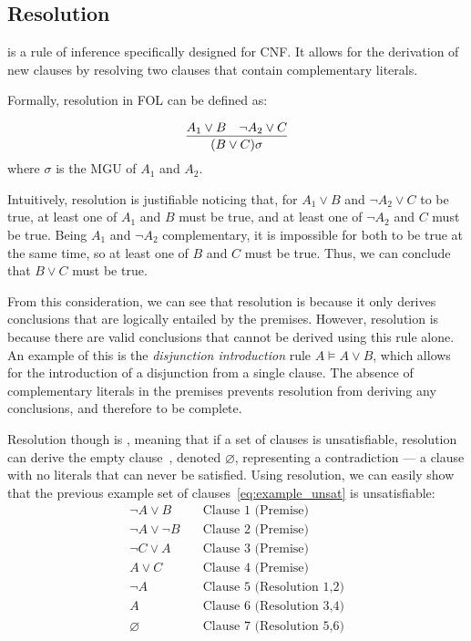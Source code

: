 \subsection{Resolution}\label{subsec:resolution}

 is a rule of inference specifically designed for CNF\@. It allows for the derivation of new clauses by resolving two clauses that contain complementary literals.

Formally, resolution in FOL can be defined as:

\begin{equation}
  \infer{(B\lor C)\sigma}{A_1 \lor B & \neg A_2 \lor C}
\end{equation}
\indent where \(\sigma\) is the MGU of \(A_1\) and \(A_2\).

\noindent Intuitively, resolution is justifiable noticing that, for \(A_1 \lor B\) and \(\neg A_2 \lor C\) to be true, at least one of \(A_1\) and \(B\) must be true, and at least one of \(\neg A_2\) and \(C\) must be true.
Being \(A_1\) and \(\neg A_2\) complementary, it is impossible for both to be true at the same time, so at least one of \(B\) and \(C\) must be true. Thus, we can conclude that \(B \lor C\) must be true.

From this consideration, we can see that resolution is  because it only derives conclusions that are logically entailed by the premises.
However, resolution is  because there are valid conclusions that cannot be derived using this rule alone.
An example of this is the \emph{disjunction introduction} rule \(A \models A \lor B\), which allows for the introduction of a disjunction from a single clause.
The absence of complementary literals in the premises prevents resolution from deriving any conclusions, and therefore to be complete.

Resolution though is , meaning that if a set of clauses is unsatisfiable, resolution can derive the empty clause~\cite{robinson1965}, denoted \(\varnothing\), representing a contradiction --- a clause with no literals that can never be satisfied.
Using resolution, we can easily show that the previous example set of clauses~\ref{eq:example_unsat} is unsatisfiable:
\begin{equation}
  \begin{aligned}
    \neg A \lor B &\quad \text{Clause 1 (Premise)} \\
    \neg A \lor \neg B &\quad \text{Clause 2 (Premise)} \\
    \neg C \lor A &\quad \text{Clause 3 (Premise)} \\
    A \lor C &\quad \text{Clause 4 (Premise)} \\
    \neg A &\quad \text{Clause 5 (Resolution 1,2)} \\
    A &\quad \text{Clause 6 (Resolution 3,4)} \\
    \varnothing &\quad \text{Clause 7 (Resolution 5,6)}
  \end{aligned}
\end{equation}

